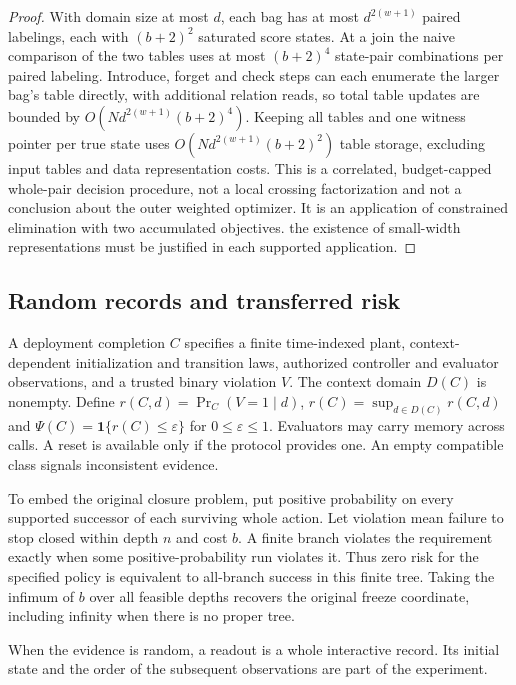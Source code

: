\begin{proof}
With domain size at most \(d\), each bag has at most \(d^{2(w+1)}\) paired labelings, each with \((b+2)^2\) saturated score states. At a join the naive comparison of the two tables uses at most \((b+2)^4\) state-pair combinations per paired labeling. Introduce, forget and check steps can each enumerate the larger bag's table directly, with additional relation reads, so total table updates are bounded by \(O(Nd^{2(w+1)}(b+2)^4)\). Keeping all tables and one witness pointer per true state uses \(O(Nd^{2(w+1)}(b+2)^2)\) table storage, excluding input tables and data representation costs. This is a correlated, budget-capped whole-pair decision procedure, not a local crossing factorization and not a conclusion about the outer weighted optimizer. It is an application of constrained elimination with two accumulated objectives. the existence of small-width representations must be justified in each supported application.

\end{proof}

\subsection{Random records and transferred risk}

A deployment completion \(C\) specifies a finite time-indexed plant, context-dependent initialization and transition laws, authorized controller and evaluator observations, and a trusted binary violation \(V\). The context domain \(D(C)\) is nonempty. Define \(r(C,d)=\Pr_C(V=1\mid d)\), \(r(C)=\sup_{d\in D(C)}r(C,d)\) and \(\Psi(C)=\mathbf1\{r(C)\le\varepsilon\}\) for \(0\le\varepsilon\le1\). Evaluators may carry memory across calls. A reset is available only if the protocol provides one. An empty compatible class signals inconsistent evidence.

To embed the original closure problem, put positive probability on every supported successor of each surviving whole action. Let violation mean failure to stop closed within depth \(n\) and cost \(b\). A finite branch violates the requirement exactly when some positive-probability run violates it. Thus zero risk for the specified policy is equivalent to all-branch success in this finite tree. Taking the infimum of \(b\) over all feasible depths recovers the original freeze coordinate, including infinity when there is no proper tree.

When the evidence is random, a readout is a whole interactive record. Its initial state and the order of the subsequent observations are part of the experiment.

